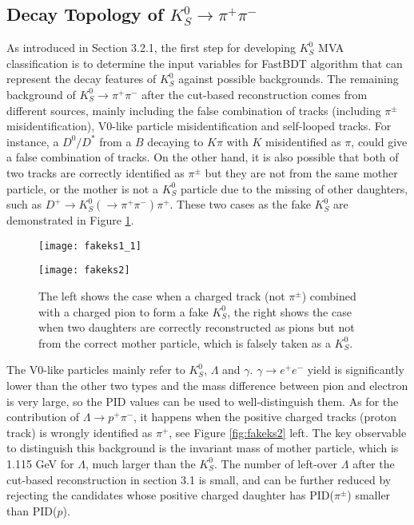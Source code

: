 

\subsection{Decay Topology of $K_S^0 \to \pi^+ \pi^-$}
As introduced in Section 3.2.1, the first step for developing $K_S^0$ MVA classification is to determine the input variables for FastBDT algorithm that can represent the decay features of $K_S^0$ against possible backgrounds.
The remaining background of  $K_S^0 \to \pi^+ \pi^-$ after the cut-based reconstruction comes from different sources, mainly including the false combination of tracks (including $\pi^{\pm}$ misidentification), V0-like particle misidentification and self-looped tracks.
For instance, a $D^0/D^*$ from a $B$ decaying to $K\pi$ with $K$ misidentified as $\pi$, could give a false combination of tracks. On the other hand, it is also possible that both of two tracks are correctly identified as $\pi^{\pm}$ but they are not from the same mother particle, or the mother is not a $K_S^0$ particle due to the missing of other daughters, such as $D^+ \to K_S^0 (  \to \pi^+ \pi^-) \pi^+$. These two cases as the fake $K_S^0$ are demonstrated in Figure \ref{fig:fakeks1}. 


\begin{figure}[htpb]
	\begin{minipage}[t]{0.5\linewidth} %
		\centering 
		\texttt{[image: fakeks1\_1]} 
	\end{minipage}%
	\begin{minipage}[t]{0.5\linewidth} 
		\centering 
		\texttt{[image: fakeks2]} 
	\end{minipage}%
	
	\caption{The left shows the case when a charged track (not $\pi^{\pm}$) combined with a charged pion to form a fake $K_S^0$, the right shows the case when two daughters are correctly reconstructed as pions but not from the correct mother particle, which is falsely taken as a $K_S^0$.}
	\label{fig:fakeks1}
\end{figure}

The V0-like particles mainly refer to $K_S^0$, $\Lambda$ and $\gamma$. $\gamma \to e^+ e^-$ yield is significantly lower than the other two types and the mass difference between pion and electron is very large, so the PID values can be used to well-distinguish them. As for the contribution of $\Lambda \to p^+ \pi^-$, it happens when the positive charged tracks (proton track) is wrongly identified as $\pi^+$, see Figure \ref{fig:fakeks2} left. The key observable to distinguish this background is the invariant mass of mother particle, which is 1.115 GeV for $\Lambda$, much larger than the $K_S^0$. The number of left-over $\Lambda$ after the cut-based reconstruction in section 3.1 is small, and can be further reduced by rejecting the candidates whose positive charged daughter has PID($\pi^{\pm}$) smaller than PID($p$).

